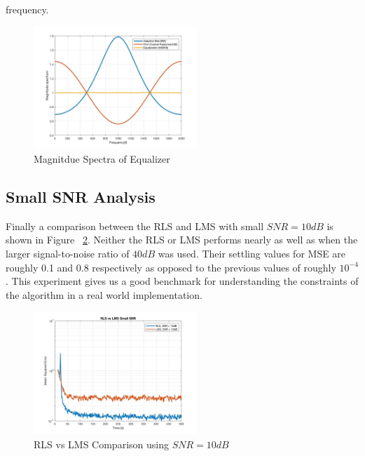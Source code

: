\documentclass[journal]{IEEEtran}
\begin{document}
frequency.
\begin{figure}[H]
  \centering
  \captionsetup{justification=centering,font = small}
  \includegraphics[width=0.55\textwidth, inner] {Plots/Project2_MagnitudeSpectrum.jpg}
  \caption{Magnitdue Spectra of Equalizer}
    \label{fig:magspec}
\end{figure}
\subsection{Small SNR Analysis}
Finally a comparison between the RLS and LMS with small $SNR = 10dB$ is shown in Figure ~\ref{fig:smallsnr}. Neither the RLS or LMS performs nearly as well
as when the larger signal-to-noise ratio of $40dB$ was used. Their settling values for MSE are roughly 0.1 and 0.8 respectively as opposed to the previous values of roughly $10^{-4}$.
This experiment gives us a good benchmark for understanding the constraints of the algorithm in a real world implementation.
\begin{figure}[H]
  \centering
  \captionsetup{justification=centering,font = small}
  \includegraphics[width=0.55\textwidth, inner] {Plots/Project2_smallSNR.jpg}
  \caption{RLS vs LMS Comparison using $SNR = 10dB$}
    \label{fig:smallsnr}
\end{figure}
\end{document}
